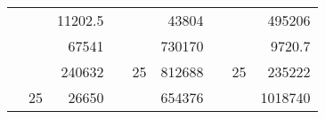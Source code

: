 \begin{table}[H]
\begin{tabular}{|ccrccrccc}
\rowcolor[HTML]{DAE8FC} 
\multicolumn{1}{|c|}{\cellcolor[HTML]{FFFFC7}}                                & \multicolumn{1}{c|}{\cellcolor[HTML]{DAE8FC}}                      & \multicolumn{1}{r|}{\cellcolor[HTML]{DAE8FC}11202.5}   & \multicolumn{1}{c|}{\cellcolor[HTML]{FFFFC7}}                                & \multicolumn{1}{c|}{\cellcolor[HTML]{DAE8FC}}                       & \multicolumn{1}{r|}{\cellcolor[HTML]{DAE8FC}43804}     & \multicolumn{1}{c|}{\cellcolor[HTML]{FFFFC7}}                                & \multicolumn{1}{c|}{\cellcolor[HTML]{DAE8FC}}                      & \multicolumn{1}{r|}{\cellcolor[HTML]{DAE8FC}495206}    \\ \cline{3-3} \cline{6-6} \cline{9-9} 
\multicolumn{1}{|c|}{\cellcolor[HTML]{FFFFC7}}                                & \multicolumn{1}{c|}{\cellcolor[HTML]{DAE8FC}}                      & \multicolumn{1}{r|}{\cellcolor[HTML]{DDFDFF}67541}     & \multicolumn{1}{c|}{\cellcolor[HTML]{FFFFC7}}                                & \multicolumn{1}{c|}{\cellcolor[HTML]{DAE8FC}}                       & \multicolumn{1}{r|}{\cellcolor[HTML]{DDFDFF}730170}    & \multicolumn{1}{c|}{\cellcolor[HTML]{FFFFC7}}                                & \multicolumn{1}{c|}{\cellcolor[HTML]{DAE8FC}}                      & \multicolumn{1}{r|}{\cellcolor[HTML]{DDFDFF}9720.7}    \\ \cline{3-3} \cline{6-6} \cline{9-9} 
\rowcolor[HTML]{DAE8FC} 
\multicolumn{1}{|c|}{\cellcolor[HTML]{FFFFC7}}                                & \multicolumn{1}{c|}{\cellcolor[HTML]{DAE8FC}}                      & \multicolumn{1}{r|}{\cellcolor[HTML]{DAE8FC}240632}    & \multicolumn{1}{c|}{\cellcolor[HTML]{FFFFC7}}                                & \multicolumn{1}{c|}{\multirow{-9}{*}{\cellcolor[HTML]{DAE8FC}25}}   & \multicolumn{1}{r|}{\cellcolor[HTML]{DAE8FC}812688}    & \multicolumn{1}{c|}{\cellcolor[HTML]{FFFFC7}}                                & \multicolumn{1}{c|}{\multirow{-9}{*}{\cellcolor[HTML]{DAE8FC}25}}  & \multicolumn{1}{r|}{\cellcolor[HTML]{DAE8FC}235222}    \\ \cline{3-3} \cline{5-6} \cline{8-9} 
\multicolumn{1}{|c|}{\cellcolor[HTML]{FFFFC7}}                                & \multicolumn{1}{c|}{\multirow{-10}{*}{\cellcolor[HTML]{DAE8FC}25}} & \multicolumn{1}{r|}{\cellcolor[HTML]{DDFDFF}26650}     & \multicolumn{1}{c|}{\cellcolor[HTML]{FFFFC7}}                                & \multicolumn{1}{c|}{\cellcolor[HTML]{DDFDFF}}                       & \multicolumn{1}{r|}{\cellcolor[HTML]{DAE8FC}654376}    & \multicolumn{1}{c|}{\cellcolor[HTML]{FFFFC7}}                                & \multicolumn{1}{c|}{\cellcolor[HTML]{DDFDFF}}                      & \multicolumn{1}{r|}{\cellcolor[HTML]{DAE8FC}1018740}   \\ \cline{2-3} \cline{6-6} \cline{9-9} 

\end{tabular}
\end{table}
